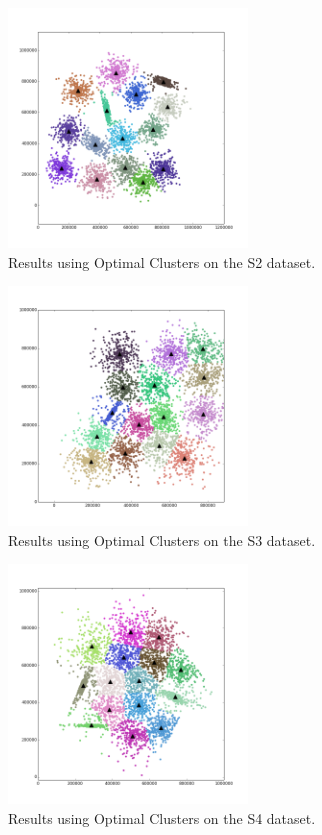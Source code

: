 \documentclass[journal]{IEEEtran}
\begin{document}
\begin{figure}[!t]
	\centering
	\includegraphics[width=2.5in]{../figs/s2_true_euclid_15.png}
	\caption{Results using Optimal Clusters on the S2 dataset.}
	\label{fig_sim}
\end{figure}
\begin{figure}[!t]
	\centering
	\includegraphics[width=2.5in]{../figs/s3_true_euclid_15.png}
	\caption{Results using Optimal Clusters on the S3 dataset.}
	\label{fig_sim}
\end{figure}
\begin{figure}[!t]
	\centering
	\includegraphics[width=2.5in]{../figs/s4_true_euclid_15.png}
	\caption{Results using Optimal Clusters on the S4 dataset.}
	\label{fig_sim}
\end{figure}
\end{document}
